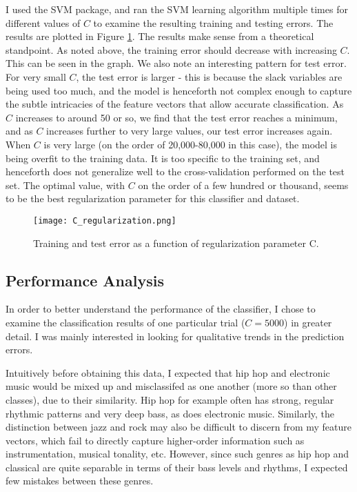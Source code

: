 \documentclass[aps,twocolumn,secnumarabic,balancelastpage,amsmath,amssymb,nofootinbib]{revtex4-1}
\begin{document}
I used the SVM package, and ran the SVM learning algorithm multiple times for different values of $C$ to examine the resulting training and testing errors. The results are plotted in Figure \ref{fig:C_Regularization}. The results make sense from a theoretical standpoint. As noted above, the training error should decrease with increasing $C$. This can be seen in the graph. We also note an interesting pattern for test error. For very small $C$, the test error is larger - this is because the slack variables are being used too much, and the model is henceforth not complex enough to capture the subtle intricacies of the feature vectors that allow accurate classification. As $C$ increases to around 50 or so, we find that the test error reaches a minimum, and as $C$ increases further to very large values, our test error increases again. When $C$ is very large (on the order of 20,000-80,000 in this case), the model is being overfit to the training data. It is too specific to the training set, and henceforth does not generalize well to the cross-validation performed on the test set. The optimal value, with $C$ on the order of a few hundred or thousand, seems to be the best regularization parameter for this classifier and dataset.

\begin{figure}
\texttt{[image: C\_regularization.png]}
\caption{Training and test error as a function of regularization parameter C.}
\label{fig:C_Regularization}
\end{figure}


\subsection*{Performance Analysis}
In order to better understand the performance of the classifier, I chose to examine the classification results of one particular trial ($C = 5000$) in greater detail. I was mainly interested in looking for qualitative trends in the prediction errors.

Intuitively before obtaining this data, I expected that hip hop and electronic music would be mixed up and misclassifed as one another (more so than other classes), due to their similarity. Hip hop for example often has strong, regular rhythmic patterns and very deep bass, as does electronic music. Similarly, the distinction between jazz and rock may also be difficult to discern from my feature vectors, which fail to directly capture higher-order information such as instrumentation, musical tonality, etc. However, since such genres as hip hop and classical are quite separable in terms of their bass levels and rhythms, I expected few mistakes between these genres.
\end{document}
